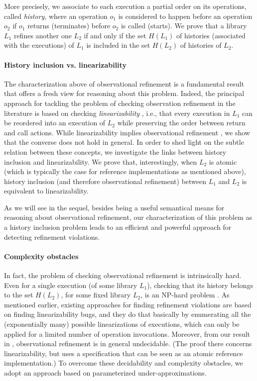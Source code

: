 More precisely, we associate to each execution a partial order on its
operations, called \emph{history}, where an operation $o_1$ is considered to
happen before an operation $o_2$ if $o_1$ returns (terminates) before $o_2$ is
called (starts). We prove that a library $L_1$ refines another one $L_2$ if and
only if the set $H(L_1)$ of histories (associated with the executions) of $L_1$
is included in the set $H(L_2)$ of histories of $L_2$.

\paragraph{History inclusion vs. linearizability}

The characterization above of observational refinement is a fundamental result
that offers a fresh view for reasoning about this problem. Indeed, the
principal approach for tackling the problem of checking observation refinement
in the literature is based on checking \emph{linearizability} \cite{}, i.e.,
that every execution in $L_1$ can be reordered into an execution of $L_2$ while
preserving the order between return and call actions. While linearizability
implies observational refinement \cite{}, we show that the converse does not
hold in general. In order to shed light on the subtle relation between these
concepts, we investigate the links between history inclusion and
linearizability. We prove that, interestingly, when $L_2$ is atomic (which is
typically the case for reference implementations as mentioned above), history
inclusion (and therefore observational refinement) between $L_1$ and $L_2$ is
equivalent to linearizability.

As we will see in the sequel, besides being a useful semantical means for
reasoning about observational refinement, our characterization of this problem
as a history inclusion problem leads to an efficient and powerful approach for
detecting refinement violations.

\paragraph{Complexity obstacles}

In fact, the problem of checking observational refinement is intrinsically
hard. Even for a single execution (of some library $L_1$), checking that its
history belongs to the set $H(L_2)$, for some fixed library $L_2$, is an
NP-hard problem \cite{}. As mentioned earlier, existing approaches for finding
refinement violations are based on finding linearizability bugs, and they do
that basically by enumerating all the (exponentially many) possible
linearizations of executions, which can only be applied for a limited number of
operation invocations. Moreover, from our result in \cite{}, observational
refinement is in general undecidable. (The proof there concerns
linearizability, but uses a specification that can be seen as an atomic
reference implementation.) To overcome these decidability and complexity
obstacles, we adopt an approach based on parameterized under-approximations.

